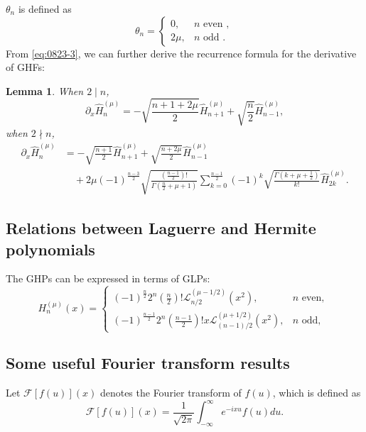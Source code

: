 \documentclass[pdflatex,sn-aps]{sn-jnl}%
\theoremstyle{thmstyleone}%
\newtheorem{lemma}{Lemma}[section]
\theoremstyle{thmstyletwo}%
\theoremstyle{thmstylethree}%
\begin{document}
$\theta_n$ is defined as
\begin{equation}\label{eq:0823-5}
  \theta_n= \begin{cases}0, & n \text { even }, \\ 2 \mu, & n \text { odd }.\end{cases}
\end{equation}
From \eqref{eq:0823-3}, we can further derive the recurrence formula
for the derivative of GHFs:
\begin{lemma}\label{lem:derivative recurrence}
When $2 \mid n$, 
\begin{equation}\label{eq:0823-6}
  \partial_x \widehat{H}_n^{(\mu)}=-\sqrt{\frac{n+1+2 \mu}{2}} \widehat{H}_{n+1}^{(\mu)}+\sqrt{\frac{n}{2}} \widehat{H}_{n-1}^{(\mu)},
\end{equation}
when $2 \nmid n$,
\begin{equation}\label{eq:0823-7}
  \begin{aligned}
  \partial_x \widehat{H}_n^{(\mu)} & =
  -\sqrt{\frac{n+1}{2}} \widehat{H}_{n+1}^{(\mu)}
  +\sqrt{\frac{n+2 \mu}{2}} \widehat{H}_{n-1}^{(\mu)}  \\
  &{}\quad + 2 \mu (-1)^{\frac{n-3}{2}} \sqrt{\frac{\left(\frac{n-1}{2}\right)!}{\Gamma\left(\frac{n}{2}+\mu+1\right)}}
   \sum_{k=0}^{\frac{n-1}{2}}(-1)^k \sqrt{\frac{\Gamma\left(k+\mu+\frac{1}{2}\right)}{k!}} \widehat{H}_{2 k}^{(\mu)}.
  \end{aligned}
\end{equation}
\end{lemma}

\subsection{Relations between Laguerre and Hermite polynomials}
The GHPs can be expressed in terms of GLPs:
\begin{equation}\label{eq:relaion-Laguerre-Hermite}
  H_n^{(\mu)}(x)= \begin{cases}(-1)^{\frac{n}{2}} 2^n\left(\frac{n}{2}\right)!\mathscr{L}_{n / 2}^{(\mu-1 / 2)}\left(x^2\right), & n \text { even, } \\ (-1)^{\frac{n-1}{2}} 2^n\left(\frac{n-1}{2}\right)!x \mathscr{L}_{(n-1) / 2}^{(\mu+1 / 2)}\left(x^2\right), & n \text { odd, }\end{cases}
\end{equation}

\subsection{Some useful Fourier transform results}
Let $\mathcal{F}[f(u)](x)$ denotes the Fourier transform of $f(u)$, which
is defined as
\begin{equation}\label{eq:0823-1}
  \mathcal{F}[f(u)](x)=\frac{1}{\sqrt{2 \pi}} \int_{-\infty}^{\infty} e^{-i x u} f(u) d u.
\end{equation}
\end{document}
